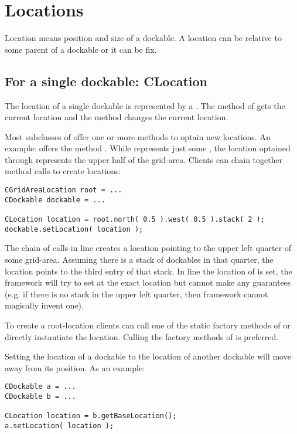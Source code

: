 \section{Locations} \label{sec:location}
Location means position and size of a dockable. A location can be relative to some parent of a dockable or it can be fix.

\subsection{For a single dockable: CLocation}
The location of a single dockable is represented by a . The method  of  gets the current location and the method \linebreak {} changes the current location.

Most subclasses of  offer one or more methods to optain new locations. An example:  offers the method . While  represents just some , the location optained through  represents the upper half of the grid-area. Clients can chain together method calls to create locations:
\begin{lstlisting}
CGridAreaLocation root = ...
CDockable dockable = ...
		
CLocation location = root.north( 0.5 ).west( 0.5 ).stack( 2 );
dockable.setLocation( location );
\end{lstlisting}
The chain of calls in line  creates a location pointing to the upper left quarter of some grid-area. Assuming there is a stack of dockables in that quarter, the location points to the third entry of that stack. In line  the location of  is set, the framework will try to set  at the exact location but cannot make any guarantees (e.g. if there is no stack in the upper left quarter, then framework cannot magically invent one).

To create a root-location clients can call one of the static factory methods of  or directly instantiate the location. Calling the factory methods of  is preferred.

Setting the location of a dockable  to the location of another dockable  will move away  from its position. As an example:
\begin{lstlisting}
CDockable a = ...
CDockable b = ...

CLocation location = b.getBaseLocation();
a.setLocation( location );
\end{lstlisting}

